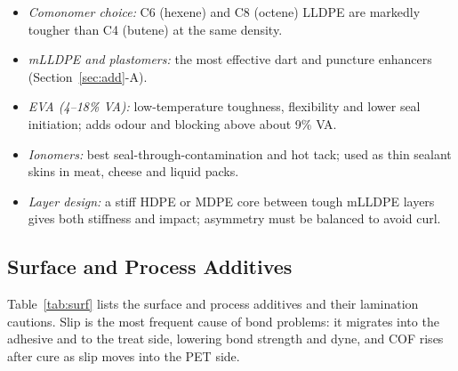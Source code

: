 \documentclass[10pt,twocolumn,a4paper]{article}
\begin{document}
\begin{itemize}\setlength\itemsep{1pt}
\item \textit{Comonomer choice:} C6 (hexene) and C8 (octene) LLDPE are markedly tougher than C4 (butene) at the same density.
\item \textit{mLLDPE and plastomers:} the most effective dart and puncture enhancers (Section~\ref{sec:add}-A).
\item \textit{EVA (4–18\% VA):} low-temperature toughness, flexibility and lower seal initiation; adds odour and blocking above about 9\% VA.
\item \textit{Ionomers:} best seal-through-contamination and hot tack; used as thin sealant skins in meat, cheese and liquid packs.
\item \textit{Layer design:} a stiff HDPE or MDPE core between tough mLLDPE layers gives both stiffness and impact; asymmetry must be balanced to avoid curl.
\end{itemize}

\subsection{Surface and Process Additives}

Table~\ref{tab:surf} lists the surface and process additives and their lamination cautions. Slip is the most frequent cause of bond problems: it migrates into the adhesive and to the treat side, lowering bond strength and dyne, and COF rises after cure as slip moves into the PET side.
\end{document}
